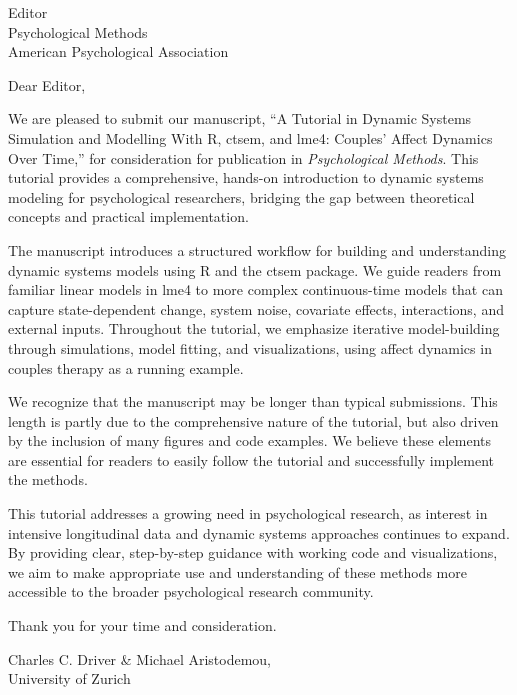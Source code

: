 \documentclass[]{letter}
\begin{document}
\begin{letter}{Editor\\
Psychological Methods\\
American Psychological Association}

\opening{Dear Editor,}

We are pleased to submit our manuscript, ``A Tutorial in Dynamic Systems Simulation and Modelling With R, ctsem, and lme4: Couples' Affect Dynamics Over Time,'' for consideration for publication in \textit{Psychological Methods}. This tutorial provides a comprehensive, hands-on introduction to dynamic systems modeling for psychological researchers, bridging the gap between theoretical concepts and practical implementation.

The manuscript introduces a structured workflow for building and understanding dynamic systems models using R and the ctsem package. We guide readers from familiar linear models in lme4 to more complex continuous-time models that can capture state-dependent change, system noise, covariate effects, interactions, and external inputs. Throughout the tutorial, we emphasize iterative model-building through simulations, model fitting, and visualizations, using affect dynamics in couples therapy as a running example.

We recognize that the manuscript may be longer than typical submissions. This length is partly due to the  comprehensive nature of the tutorial, but also driven by the inclusion of many figures and code examples. We believe these elements are essential for readers to easily follow the tutorial and successfully implement the methods. 

This tutorial addresses a growing need in psychological research, as interest in intensive longitudinal data and dynamic systems approaches continues to expand. By providing clear, step-by-step guidance with working code and visualizations, we aim to make appropriate use and understanding of these methods more accessible to the broader psychological research community.

Thank you for your time and consideration. 

Charles C. Driver \& Michael Aristodemou,\\
University of Zurich

\end{letter}
\end{document}

